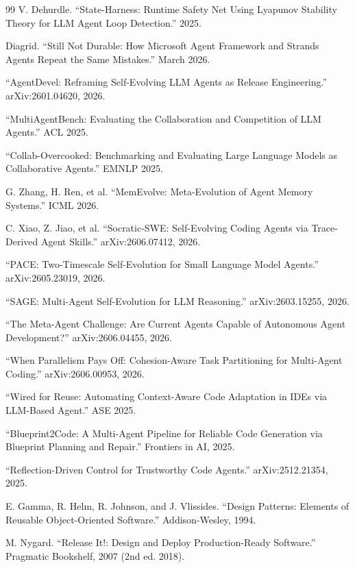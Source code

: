 \documentclass[11pt,a4paper]{article}
\begin{document}
\begin{thebibliography}{99}
V. Dehurdle. ``State-Harness: Runtime Safety Net Using Lyapunov Stability Theory for LLM Agent Loop Detection.'' 2025.

Diagrid. ``Still Not Durable: How Microsoft Agent Framework and Strands Agents Repeat the Same Mistakes.'' March 2026.

``AgentDevel: Reframing Self-Evolving LLM Agents as Release Engineering.'' arXiv:2601.04620, 2026.

``MultiAgentBench: Evaluating the Collaboration and Competition of LLM Agents.'' ACL 2025.

``Collab-Overcooked: Benchmarking and Evaluating Large Language Models as Collaborative Agents.'' EMNLP 2025.

G. Zhang, H. Ren, et al. ``MemEvolve: Meta-Evolution of Agent Memory Systems.'' ICML 2026.

C. Xiao, Z. Jiao, et al. ``Socratic-SWE: Self-Evolving Coding Agents via Trace-Derived Agent Skills.'' arXiv:2606.07412, 2026.

``PACE: Two-Timescale Self-Evolution for Small Language Model Agents.'' arXiv:2605.23019, 2026.

``SAGE: Multi-Agent Self-Evolution for LLM Reasoning.'' arXiv:2603.15255, 2026.

``The Meta-Agent Challenge: Are Current Agents Capable of Autonomous Agent Development?'' arXiv:2606.04455, 2026.

``When Parallelism Pays Off: Cohesion-Aware Task Partitioning for Multi-Agent Coding.'' arXiv:2606.00953, 2026.

``Wired for Reuse: Automating Context-Aware Code Adaptation in IDEs via LLM-Based Agent.'' ASE 2025.

``Blueprint2Code: A Multi-Agent Pipeline for Reliable Code Generation via Blueprint Planning and Repair.'' Frontiers in AI, 2025.

``Reflection-Driven Control for Trustworthy Code Agents.'' arXiv:2512.21354, 2025.

E. Gamma, R. Helm, R. Johnson, and J. Vlissides. ``Design Patterns: Elements of Reusable Object-Oriented Software.'' Addison-Wesley, 1994.

M. Nygard. ``Release It!: Design and Deploy Production-Ready Software.'' Pragmatic Bookshelf, 2007 (2nd ed. 2018).


\end{thebibliography}
\end{document}
